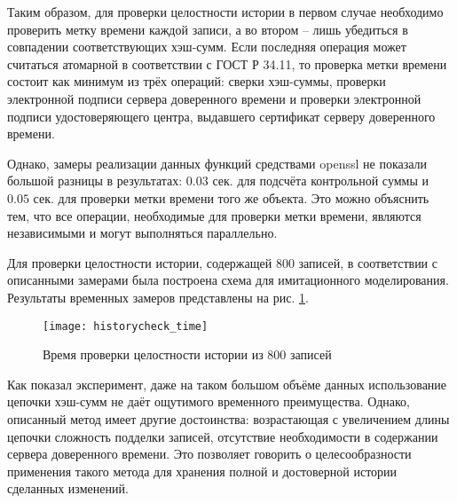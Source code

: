 \vspace{\baselineskip}
Таким образом, для проверки целостности истории в первом случае необходимо проверить метку времени каждой записи, а во втором -- лишь убедиться в совпадении соответствующих хэш-сумм. Если последняя операция может считаться атомарной в соответствии с ГОСТ Р 34.11, то проверка метки времени состоит как минимум из трёх операций: сверки хэш-суммы, проверки электронной подписи сервера доверенного времени и проверки электронной подписи удостоверяющего центра, выдавшего сертификат серверу доверенного времени.

\vspace{\baselineskip}
Однако, замеры реализации данных функций средствами openssl не показали большой разницы в результатах: $0.03$ сек. для подсчёта контрольной суммы и $0.05$ сек. для проверки метки времени того же объекта. Это можно объяснить тем, что все операции, необходимые для проверки метки времени, являются независимыми и могут выполняться параллельно.

\vspace{\baselineskip}
Для проверки целостности истории, содержащей 800 записей, в соответствии с описанными замерами была построена схема для имитационного моделирования. Результаты временных замеров представлены на рис. \ref{img:historycheck_time}.

\begin{figure}[h!]
  \centering
  \texttt{[image: historycheck\_time]}
  \caption{Время проверки целостности истории из 800 записей}
  \label{img:historycheck_time}
\end{figure}

\vspace{\baselineskip}
Как показал эксперимент, даже на таком большом объёме данных использование цепочки хэш-сумм не даёт ощутимого временн\textit{о}го преимущества. Однако, описанный метод имеет другие достоинства: возрастающая с увеличением длины цепочки сложность подделки записей, отсутствие необходимости в содержании сервера доверенного времени. Это позволяет говорить о целесообразности применения такого метода для хранения полной и достоверной истории сделанных изменений.